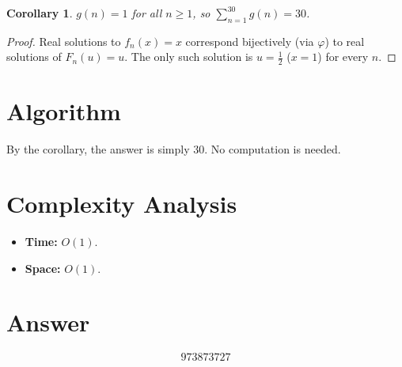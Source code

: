 \documentclass[11pt]{article}
\newtheorem{corollary}[theorem]{Corollary}
\begin{document}
\begin{corollary}
$g(n) = 1$ for all $n \ge 1$, so $\displaystyle\sum_{n=1}^{30} g(n) = 30$.
\end{corollary}

\begin{proof}
Real solutions to $f_n(x) = x$ correspond bijectively (via $\varphi$) to real solutions of $F_n(u) = u$. The only such solution is $u = \frac{1}{2}$ ($x = 1$) for every $n$.
\end{proof}

\section{Algorithm}

By the corollary, the answer is simply $30$. No computation is needed.

\section{Complexity Analysis}

\begin{itemize}
    \item \textbf{Time:} $O(1)$.
    \item \textbf{Space:} $O(1)$.
\end{itemize}

\section{Answer}

\[
\boxed{973873727}
\]
\end{document}

